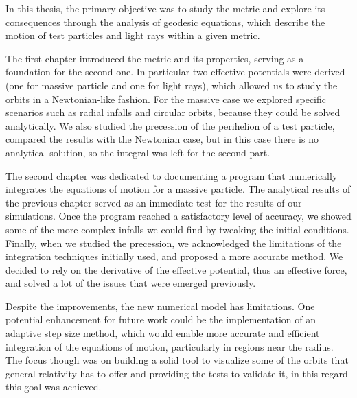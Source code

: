 
In this thesis, the primary objective was to study the \Sh metric and explore
its consequences through the analysis of geodesic equations, which describe the
motion of test particles and light rays within a given metric.

The first chapter introduced the \Sh metric and its properties, serving as a
foundation for the second one.
In particular two effective potentials were derived (one for massive particle
and one for light rays), which allowed us to study the orbits in a
Newtonian-like fashion.
For the massive case we explored specific scenarios such as radial infalls and
circular orbits, because they could be solved analytically.
We also studied the precession of the perihelion of a test particle, compared
the results with the Newtonian case, but in this case there is no analytical
solution, so the integral was left for the second part.

The second chapter was dedicated to documenting a program that numerically
integrates the equations of motion for a massive particle.
The analytical results of the previous chapter served as an immediate test for
the results of our simulations.
Once the program reached a satisfactory level of accuracy, we showed some of the
more complex infalls we could find by tweaking the initial conditions.
Finally, when we studied the precession, we acknowledged the limitations of the
integration techniques initially used, and proposed a more accurate method. 
We decided to rely on the derivative of the effective potential, thus an
effective force, and solved a lot of the issues that were emerged previously.

Despite the improvements, the new numerical model has limitations.
One potential enhancement for future work could be the implementation of an
adaptive step size method, which would enable more accurate and efficient
integration of the equations of motion, particularly in regions near the \Sh
radius.
The focus though was on building a solid tool to visualize some of the orbits
that general relativity has to offer and providing the tests to 
validate it, in this regard this goal was achieved.
